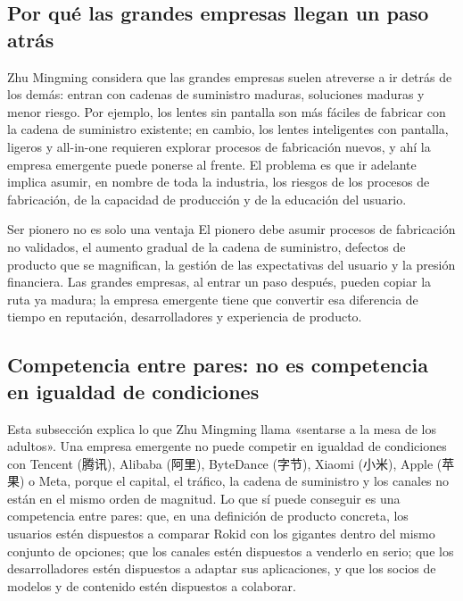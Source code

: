 \subsection{Por qué las grandes empresas llegan un paso atrás}

Zhu Mingming considera que las grandes empresas suelen atreverse a ir detrás de los demás: entran con cadenas de suministro maduras, soluciones maduras y menor riesgo. Por ejemplo, los lentes sin pantalla son más fáciles de fabricar con la cadena de suministro existente; en cambio, los lentes inteligentes con pantalla, ligeros y all-in-one requieren explorar procesos de fabricación nuevos, y ahí la empresa emergente puede ponerse al frente. El problema es que ir adelante implica asumir, en nombre de toda la industria, los riesgos de los procesos de fabricación, de la capacidad de producción y de la educación del usuario.

\begin{warningbox}{Ser pionero no es solo una ventaja}
El pionero debe asumir procesos de fabricación no validados, el aumento gradual de la cadena de suministro, defectos de producto que se magnifican, la gestión de las expectativas del usuario y la presión financiera. Las grandes empresas, al entrar un paso después, pueden copiar la ruta ya madura; la empresa emergente tiene que convertir esa diferencia de tiempo en reputación, desarrolladores y experiencia de producto.
\end{warningbox}

\subsection{Competencia entre pares: no es competencia en igualdad de condiciones}

Esta subsección explica lo que Zhu Mingming llama «sentarse a la mesa de los adultos». Una empresa emergente no puede competir en igualdad de condiciones con Tencent (腾讯), Alibaba (阿里), ByteDance (字节), Xiaomi (小米), Apple (苹果) o Meta, porque el capital, el tráfico, la cadena de suministro y los canales no están en el mismo orden de magnitud. Lo que sí puede conseguir es una competencia entre pares: que, en una definición de producto concreta, los usuarios estén dispuestos a comparar Rokid con los gigantes dentro del mismo conjunto de opciones; que los canales estén dispuestos a venderlo en serio; que los desarrolladores estén dispuestos a adaptar sus aplicaciones, y que los socios de modelos y de contenido estén dispuestos a colaborar.


